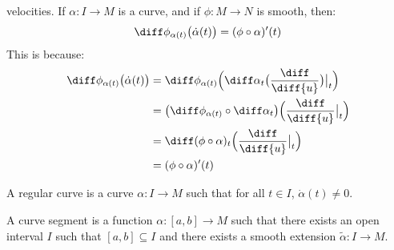 \documentclass{article}                                                        %
\begin{document}
            velocities. If $\alpha:I\rightarrow{M}$ is a curve, and if
            $\phi:M\rightarrow{N}$ is smooth, then:
            \begin{equation}
                \diff\phi_{\alpha(t)}\big(\dot{\alpha}(t)\big)=
                    (\phi\circ\alpha)'(t)
            \end{equation}
            This is because:
            \begin{align}
                \diff\phi_{\alpha(t)}\big(\dot{\alpha}(t)\big)
                &=\diff\phi_{\alpha(t)}\Big(\diff\alpha_{t}
                    \big(\frac{\diff}{\diff{u}}\big)\big|_{t}\Big)\\
                    &=\big(\diff\phi_{\alpha(t)}\circ\diff\alpha_{t}\big)
                        \Big(\frac{\diff}{\diff{u}}\big|_{t}\Big)\\
                    &=\diff(\phi\circ\alpha)_{t}
                        \Big(\frac{\diff}{\diff{u}}\big|_{t}\Big)\\
                    &=(\phi\circ\alpha)'(t)
            \end{align}
            \begin{definition}
                A regular curve is a curve $\alpha:I\rightarrow{M}$ such that
                for all $t\in{I}$, $\dot{\alpha}(t)\ne{0}$.
            \end{definition}
            \begin{definition}
                A curve segment is a function $\alpha:[a,b]\rightarrow{M}$ such
                that there exists an open interval $I$ such that
                $[a,b]\subseteq{I}$ and there exists a smooth extension
                $\tilde{\alpha}:I\rightarrow{M}$.
            \end{definition}
\end{document}
